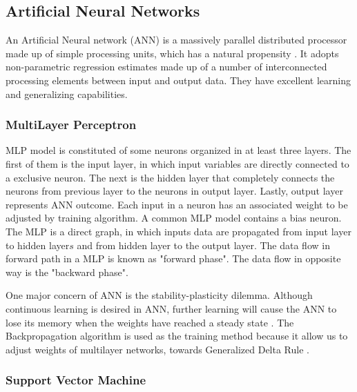 \documentclass[a4paper,twoside]{article}
\begin{document}
\subsection{Artificial Neural Networks}

\noindent An Artificial Neural network (ANN) is a massively parallel distributed processor made up of simple processing units, which has a natural propensity \cite{linlee1996neuralfuzzy}. It adopts non-parametric regression estimates made up of a number of interconnected processing elements between input and output data. They have excellent learning and generalizing capabilities.


\subsubsection{MultiLayer Perceptron}

\noindent MLP model is constituted of some neurons organized in at least three layers. The first of them is the input layer, in which input variables are directly connected to a exclusive neuron. The next is the hidden layer that completely connects the neurons from previous layer to the neurons in output layer. Lastly, output layer represents ANN outcome. Each input in a neuron has an associated weight to be adjusted by training algorithm. A common MLP model contains a bias neuron. The MLP is a direct graph, in which inputs data are propagated from input layer to hidden layer\(s\) and from hidden layer to the output layer. The data flow in forward path in a MLP is known as "forward phase". The data flow in opposite way is the "backward phase".

One major concern of ANN is the stability-plasticity dilemma. Although continuous learning is desired in ANN, further learning will cause the ANN to lose its memory when the weights have reached a steady state \cite{haykin1994neural}. The Backpropagation algorithm is used as the training method because it allow us to adjust weights of multilayer networks, towards Generalized Delta Rule \cite{rumelhart1985learning}. 

\subsubsection{Support Vector Machine}
\end{document}
